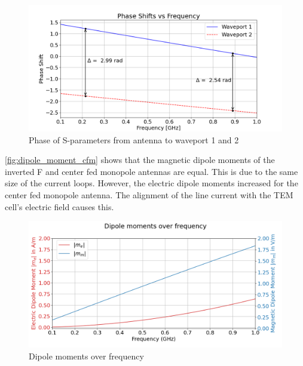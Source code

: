 \begin{figure}[h]
    \centering
    \includegraphics[width=1\linewidth]{Documentation//content//30_simulations//img/phase_shift_cfm.png}
    \caption{Phase of S-parameters from antenna to waveport 1 and 2}
    \label{fig:phase_shift_cfm}
\end{figure}

\autoref{fig:dipole_moment_cfm} shows that the magnetic dipole moments of the inverted F and center fed monopole antennas are equal. This is due to the same size of the current loops. However, the electric dipole moments increased for the center fed monopole antenna. The alignment of the line current with the TEM cell's electric field causes this.

\begin{figure}[h]
    \centering
    \includegraphics[width=1\linewidth]{Documentation//content//30_simulations//img/dipole_moment_cfm.png}
    \caption{Dipole moments over frequency}
    \label{fig:dipole_moment_cfm}
\end{figure}



